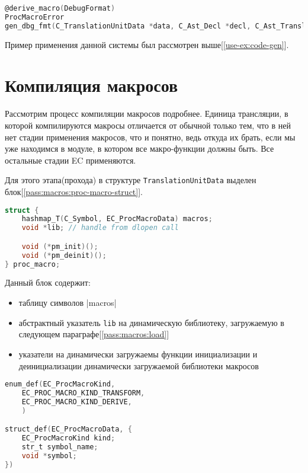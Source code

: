\begin{lstlisting}[language=c, caption={Заголовок функции gen\_dbg\_fmt}, label={pass:macros:macro-sym-diff}]
@derive_macro(DebugFormat)
ProcMacroError
gen_dbg_fmt(C_TranslationUnitData *data, C_Ast_Decl *decl, C_Ast_TranslationUnit **out_node);
\end{lstlisting}

Пример применения данной системы был рассмотрен выше[\ref{use-ex:code-gen}].


\section{Компиляция макросов}
\label{pass:macros:compile}
Рассмотрим процесс компиляции макросов подробнее.
Единица трансляции, в которой компилируются макросы отличается от обычной только тем, что в ней нет стадии применения макросов, 
что и понятно, ведь откуда их брать, если мы уже находимся в модуле, в котором все макро-функции должны быть. Все остальные стадии EC применяются.

Для этого этапа(прохода) в структуре \verb|TranslationUnitData| выделен блок[\ref{pass:macros:proc-macro-struct}].

\begin{lstlisting}[language=c, caption={Блок отвечающий за макро-функции}, label={pass:macros:proc-macro-struct}]
struct {
    hashmap_T(C_Symbol, EC_ProcMacroData) macros;
    void *lib; // handle from dlopen call

    void (*pm_init)();
    void (*pm_deinit)();
} proc_macro;
\end{lstlisting}

Данный блок содержит:
\begin{itemize}
    \item таблицу символов |macros|
    \item абстрактный указатель \verb|lib| на динамическую библиотеку, загружаемую в следующем параграфе[\ref{pass:macros:load}]
    \item указатели на динамически загружаемы функции инициализации и деинициализации динамически загружаемой библиотеки макросов
\end{itemize}


\begin{lstlisting}[language=c, caption={Структура содержащая информацию о символе макро-функции}, label={pass:macros:proc-macro-data-struct}]
enum_def(EC_ProcMacroKind,
    EC_PROC_MACRO_KIND_TRANSFORM,
    EC_PROC_MACRO_KIND_DERIVE,
    )

struct_def(EC_ProcMacroData, {
    EC_ProcMacroKind kind;
    str_t symbol_name;
    void *symbol;
})
\end{lstlisting}

